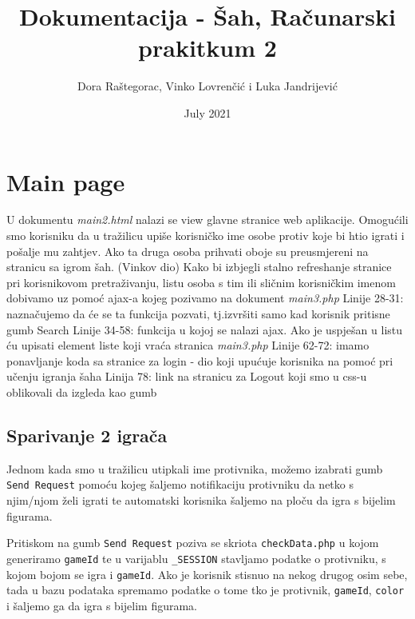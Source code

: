 \documentclass{article}
\title{Dokumentacija - Šah, Računarski prakitkum 2}
\author{Dora Raštegorac, Vinko Lovrenčić i Luka Jandrijević}
\date{July 2021}
\begin{document}
\maketitle

\section{Main page}
U dokumentu  \textit{main2.html} nalazi se view glavne stranice web aplikacije. \newline \newline
Omogućili smo korisniku da u tražilicu upiše korisničko ime osobe protiv koje bi htio igrati i pošalje mu zahtjev. Ako ta druga osoba prihvati oboje su preusmjereni na stranicu sa igrom šah. (Vinkov dio)
\newline\newline
Kako bi izbjegli stalno refreshanje stranice pri korisnikovom pretraživanju, listu osoba s tim ili sličnim korisničkim imenom dobivamo uz pomoć ajax-a kojeg pozivamo na dokument \textit{main3.php}
\newline \newline
Linije 28-31: naznačujemo da će se ta funkcija pozvati, tj.izvršiti samo kad korisnik pritisne gumb Search
\newline \newline
Linije 34-58: funkcija u kojoj se nalazi ajax. Ako je uspješan u listu ću upisati element liste koji vraća stranica \textit{main3.php}
\newline \newline
Linije 62-72: imamo ponavljanje koda sa stranice za login - dio koji upućuje korisnika na pomoć pri učenju igranja šaha
\newline \newline
Linija 78: link na stranicu za Logout koji smo u css-u oblikovali da izgleda kao gumb\newline

\subsection{Sparivanje 2 igrača}

Jednom kada smo u tražilicu utipkali ime protivnika, možemo izabrati gumb \verb|Send Request| pomoću kojeg šaljemo notifikaciju protivniku da netko s njim/njom želi igrati te automatski korisnika šaljemo na ploču da igra s bijelim figurama. 

Pritiskom na gumb \verb|Send Request| poziva se skriota \verb|checkData.php| u kojom generiramo \verb|gameId| te u varijablu \verb|_SESSION| stavljamo podatke o protivniku, s kojom bojom se igra i \verb|gameId|. Ako je korisnik stisnuo na nekog drugog osim sebe, tada u bazu podataka spremamo podatke o tome tko je protivnik, \verb|gameId|, \verb|color| i šaljemo ga da igra s bijelim figurama.
\end{document}
